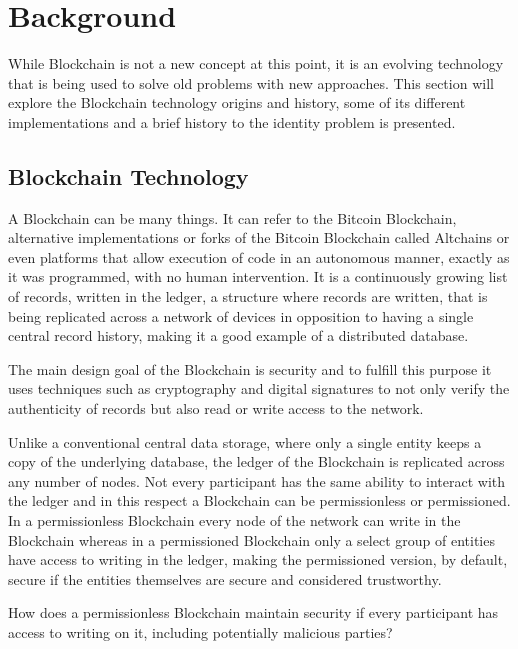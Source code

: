 \chapter{Background}

While Blockchain is not a new concept at this point, it is an evolving
technology that is being used to solve old problems with new approaches. This
section will explore the Blockchain technology origins and history, some of its
different implementations and a brief history to the identity problem is
presented.

\section{Blockchain Technology}

  A Blockchain can be many things. It can refer to the Bitcoin Blockchain,
  alternative implementations or forks of the Bitcoin Blockchain called Altchains
  or even platforms that allow execution of code in an autonomous manner, exactly
  as it was programmed, with no human intervention.  It is a continuously growing
  list of records, written in the ledger, a structure where records are written,
  that is being replicated across a network of devices in opposition to having a
  single central record history, making it a good example of a distributed
  database.  \cite{Wood2017}

  The main design goal of the Blockchain is security and to fulfill this purpose
  it uses techniques such as cryptography and digital signatures to not only
  verify the authenticity of records but also read or write access to the
  network.

  Unlike a conventional central data storage, where only a single entity keeps a
  copy of the underlying database, the ledger of the Blockchain is replicated
  across any number of nodes.  Not every participant has the same ability to
  interact with the ledger and in this respect a Blockchain can be permissionless
  or permissioned. In a permissionless Blockchain every node of the network can
  write in the Blockchain whereas in a permissioned Blockchain only a select
  group of entities have access to writing in the ledger, making the permissioned
  version, by default, secure if the entities themselves are secure and
  considered trustworthy.

  How does a permissionless Blockchain maintain security if every participant has
  access to writing on it, including potentially malicious parties?

